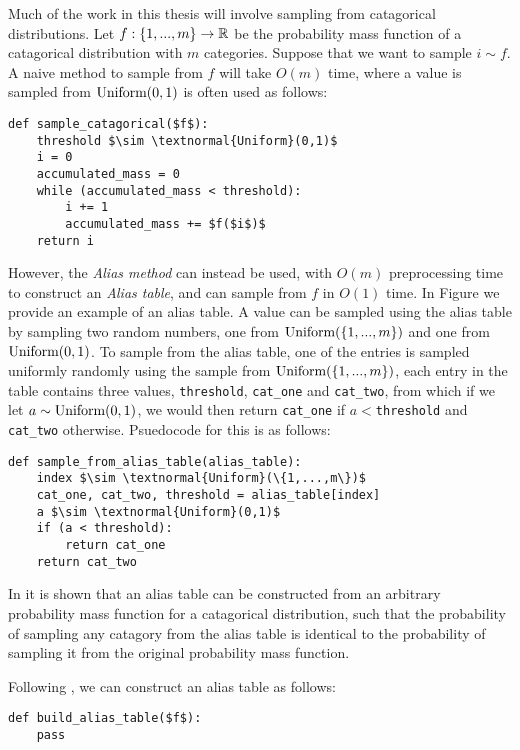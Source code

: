     Much of the work in this thesis will involve sampling from catagorical distributions. Let $f:\{1,...,m\}\rightarrow\mathbb{R}$ be the probability mass function of a catagorical distribution with $m$ categories. Suppose that we want to sample $i\sim f$. A naive method to sample from $f$ will take $O(m)$ time, where a value is sampled from $\textnormal{Uniform}(0,1)$ is often used as follows:

    \begin{lstlisting}
def sample_catagorical($f$):
    threshold $\sim \textnormal{Uniform}(0,1)$
    i = 0
    accumulated_mass = 0
    while (accumulated_mass < threshold):
        i += 1
        accumulated_mass += $f($i$)$
    return i
    \end{lstlisting}

    However, the \textit{Alias method}  can instead be used, with $O(m)$ preprocessing time to construct an \textit{Alias table}, and can sample from $f$ in $O(1)$ time. In Figure  we provide an example of an alias table. A value can be sampled using the alias table by sampling two random numbers, one from $\textnormal{Uniform}(\{1,...,m\})$ and one from $\textnormal{Uniform}(0,1)$. To sample from the alias table, one of the entries is sampled uniformly randomly using the sample from $\textnormal{Uniform}(\{1,...,m\})$, each entry in the table contains three values, \texttt{threshold}, \texttt{cat\_one} and \texttt{cat\_two}, from which if we let $a\sim\textnormal{Uniform}(0,1)$, we would then return \texttt{cat\_one} if $a<$\texttt{threshold} and \texttt{cat\_two} otherwise. Psuedocode for this is as follows:

    \begin{lstlisting}
def sample_from_alias_table(alias_table):
    index $\sim \textnormal{Uniform}(\{1,...,m\})$
    cat_one, cat_two, threshold = alias_table[index]
    a $\sim \textnormal{Uniform}(0,1)$
    if (a < threshold):
        return cat_one 
    return cat_two
    \end{lstlisting}

    In  it is shown  that an alias table can be constructed from an arbitrary probability mass function for a catagorical distribution, such that the probability of sampling any catagory from the alias table is identical to the probability of sampling it from the original probability mass function. 
    

    Following , we can construct an alias table as follows:

    \begin{lstlisting}
def build_alias_table($f$):
    pass
\end{lstlisting}

    
    
